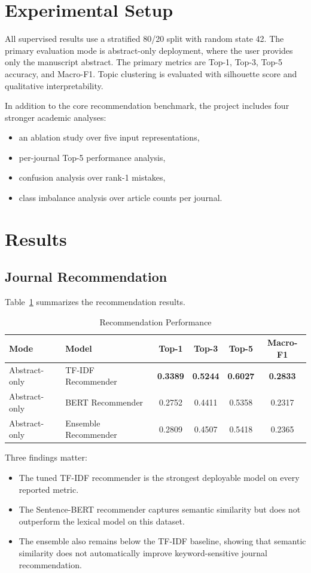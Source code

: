 \documentclass[conference]{IEEEtran}
\begin{document}
\section{Experimental Setup}
All supervised results use a stratified 80/20 split with random state 42. The primary evaluation mode is abstract-only deployment, where the user provides only the manuscript abstract. The primary metrics are Top-1, Top-3, Top-5 accuracy, and Macro-F1. Topic clustering is evaluated with silhouette score and qualitative interpretability.

In addition to the core recommendation benchmark, the project includes four stronger academic analyses:
\begin{itemize}
\item an ablation study over five input representations,
\item per-journal Top-5 performance analysis,
\item confusion analysis over rank-1 mistakes,
\item class imbalance analysis over article counts per journal.
\end{itemize}

\section{Results}
\subsection{Journal Recommendation}
Table~\ref{tab:metrics} summarizes the recommendation results.

\begin{table}[ht]
\centering
\caption{Recommendation Performance}
\label{tab:metrics}
\begin{tabular}{llcccc}
\toprule
Mode & Model & Top-1 & Top-3 & Top-5 & Macro-F1 \\
\midrule
Abstract-only & TF-IDF Recommender & \textbf{0.3389} & \textbf{0.5244} & \textbf{0.6027} & \textbf{0.2833} \\
Abstract-only & BERT Recommender & 0.2752 & 0.4411 & 0.5358 & 0.2317 \\
Abstract-only & Ensemble Recommender & 0.2809 & 0.4507 & 0.5418 & 0.2365 \\
\bottomrule
\end{tabular}
\end{table}

Three findings matter:
\begin{itemize}
\item The tuned TF-IDF recommender is the strongest deployable model on every reported metric.
\item The Sentence-BERT recommender captures semantic similarity but does not outperform the lexical model on this dataset.
\item The ensemble also remains below the TF-IDF baseline, showing that semantic similarity does not automatically improve keyword-sensitive journal recommendation.
\end{itemize}
\end{document}
